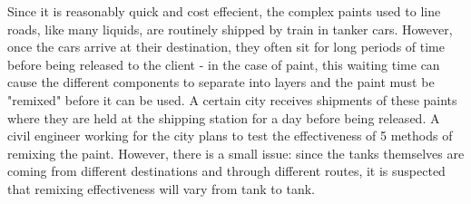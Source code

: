 \documentclass{examsetup}\usepackage[]{graphicx}\usepackage[]{color}
\begin{document}
\begin{questions}

\question
\newpage

Since it is reasonably quick and cost effecient, the complex paints used to line roads, like many liquids, are routinely shipped by train in tanker cars.
However, once the cars arrive at their destination, they often sit for long periods of time before being released to the client - in the case of paint, this waiting time can cause the different components to separate into layers and the paint must be "remixed" before it can be used.
A certain city receives shipments of these paints where they are held at the shipping station for a day before being released.
A civil engineer working for the city plans to test the effectiveness of 5 methods of remixing the paint.
However, there is a small issue: since the tanks themselves are coming from different destinations and through different routes, it is suspected that remixing effectiveness will vary from tank to tank.


\end{questions}
\end{document}
